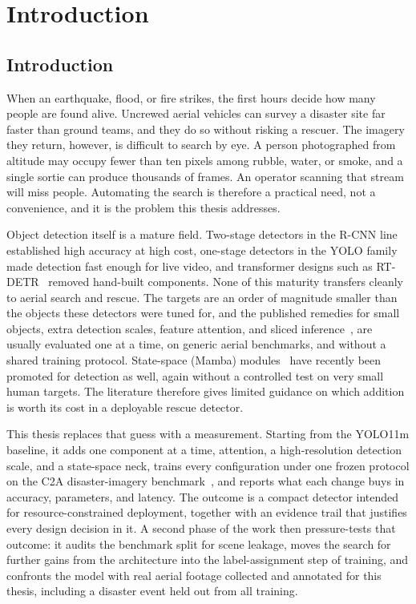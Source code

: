 \documentclass[12pt,a4paper,oneside]{report}
\begin{document}
\clearpage
{}

 \newpage \chapter{Introduction}

\section{Introduction}
When an earthquake, flood, or fire strikes, the first hours decide how many
people are found alive. Uncrewed aerial vehicles can survey a disaster site far
faster than ground teams, and they do so without risking a rescuer. The imagery
they return, however, is difficult to search by eye. A person photographed from
altitude may occupy fewer than ten pixels among rubble, water, or smoke, and a
single sortie can produce thousands of frames. An operator scanning that stream
will miss people. Automating the search is therefore a practical need, not a
convenience, and it is the problem this thesis addresses.

Object detection itself is a mature field. Two-stage detectors in the R-CNN
line~\cite{ren2015fasterrcnn} established high accuracy at high cost, one-stage
detectors in the YOLO family~\cite{redmon2016yolo, jocher2024yolo11} made
detection fast enough for live video, and transformer designs such as
RT-DETR~\cite{zhao2024rtdetr} removed hand-built components. None of this
maturity transfers cleanly to aerial search and rescue. The targets are an
order of magnitude smaller than the objects these detectors were tuned for,
and the published remedies for small objects, extra detection scales, feature
attention, and sliced inference~\cite{akyon2022sahi}, are usually evaluated one
at a time, on generic aerial benchmarks, and without a shared training
protocol. State-space (Mamba) modules~\cite{gu2023mamba} have recently been
promoted for detection as well, again without a controlled test on very small
human targets. The literature therefore gives limited guidance on which
addition is worth its cost in a deployable rescue detector.

This thesis replaces that guess with a measurement. Starting from the YOLO11m
baseline, it adds one component at a time, attention, a high-resolution
detection scale, and a state-space neck, trains every configuration under one
frozen protocol on the C2A disaster-imagery benchmark~\cite{nihal2024c2a}, and
reports what each change buys in accuracy, parameters, and latency. The outcome
is a compact detector intended for resource-constrained deployment, together with an
evidence trail that justifies every design decision in it. A second phase of
the work then pressure-tests that outcome: it audits the benchmark split for
scene leakage, moves the search for further gains from the architecture into
the label-assignment step of training, and confronts the model with real
aerial footage collected and annotated for this thesis, including a disaster
event held out from all training.
\end{document}
